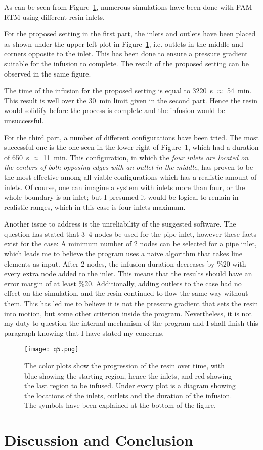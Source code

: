 \documentclass[a4paper,twosided,11pt,DIV14]{scrartcl}
\begin{document}
As can be seen from Figure~\ref{fig:resin1}, numerous simulations have been done
with PAM--RTM using different resin inlets.

For the proposed setting in the first part, the inlets and outlets have been
placed as shown under the upper-left plot in Figure~\ref{fig:resin1}, i.e.
outlets in the middle and corners opposite to the inlet.
This has been done to ensure a pressure gradient suitable for the infusion to
complete. The result of the proposed setting can be observed in the same figure.

The time of the infusion for the
proposed setting is equal to \SI{3220}{s} $\approx$ \SI{54}{min}.
This result is well over the \SI{30}{min} limit given in the second part. Hence
the resin would solidify before the process is complete and the infusion would
be unsuccessful.

For the third part, a number of different configurations have been tried. The
most successful one is the one seen in the lower-right of
Figure~\ref{fig:resin1}, which had a duration of \SI{650}{s} $\approx$
\SI{11}{min}. This configuration, in which the \emph{four inlets are located on the centers
of both opposing edges with an outlet in the middle}, has proven to be the most
effective among all viable configurations which has a realistic amount of
inlets. Of course, one can imagine a system with inlets more than four, or the
whole boundary is an inlet; but I presumed it would be logical
to remain in realistic ranges, which in this case is four inlets maximum.

Another issue to address is the unreliability of the suggested software. The
question has stated that 3--4 nodes be used for the pipe inlet, however these
facts exist for the case: A minimum number of 2 nodes can be selected for a
pipe inlet, which leads me to believe the program uses a naive algorithm that
takes line elements as input. After 2 nodes, the infusion duration decreases by
\%20 with every extra node added to the inlet. This means that the results
should have an error margin of at least \%20. Additionally, adding outlets to
the case had no effect on the simulation, and the resin continued to flow the
same way without them. This has led me to believe it is not the pressure
gradient that sets the resin into motion, but some other criterion inside the
program.
Nevertheless, it is not my duty
to question the internal mechanism of the program and I shall finish this
paragraph knowing that I have stated my concerns.

\begin{figure}[H]
\begin{center}
  \texttt{[image: q5.png]}
\end{center}
\caption{The color plots show the progression of the resin over time, with blue
  showing the starting region, hence the inlets, and red showing the last region
  to be infused. Under every plot is a diagram showing the locations of the
  inlets, outlets and the duration of the infusion. The symbols have been
  explained at the bottom of the figure.}
\label{fig:resin1}
\end{figure}

\section{Discussion and Conclusion}
\end{document}

